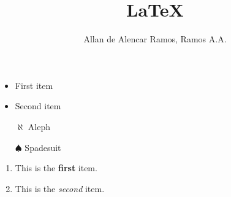 \documentclass[12pt, a4paper]{article}
\begin{document}
\title{LaTeX}
\author{Allan de Alencar Ramos, Ramos A.A.}
\maketitle

\begin{itemize}
	\item First item
	\item Second item
\end{itemize}

\begin{itemize}
	\item[$\aleph$] Aleph
	\item[$\spadesuit$] Spadesuit
\end{itemize}

\begin{enumerate}
	\item This is the \textbf{first} item.
	\item This is the \textit{second} item.
\end{enumerate}
\end{document}
